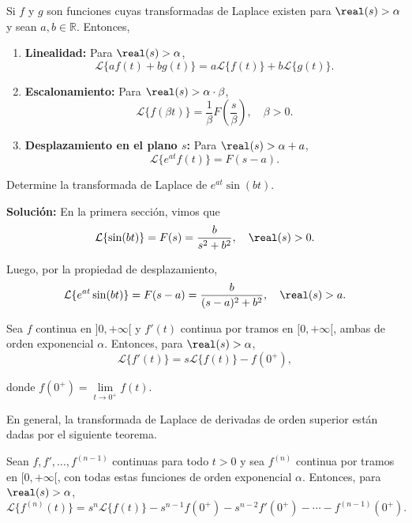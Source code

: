 \begin{teorema}
    Si $f$ y $g$ son funciones cuyas transformadas de Laplace existen para $\real(s) > \alpha$ y sean $a, b \in \mathbb{R}$. Entonces, 
\begin{enumerate}
    \item \textbf{Linealidad:} Para $\real(s) > \alpha$,
    $$\mathcal{L}\{a f(t) + b g(t)\} = a \mathcal{L}\{f(t)\} + b \mathcal{L}\{g(t)\}.$$ 

    \item \textbf{Escalonamiento:} Para $\real(s) > \alpha \cdot \beta$,
    $$\mathcal{L}\{f(\beta t) \} = \frac{1}{\beta} F \left( \frac{s}{\beta}\right), \quad \beta > 0.$$ 
    
    \item \textbf{Desplazamiento en el plano $s$:} Para $\real(s) > \alpha + a$,
    $$\mathcal{L}\{e^{at} f(t)\} = F(s-a).$$
\end{enumerate}
\end{teorema}

\begin{ejemplo}
    Determine la transformada de Laplace de $e^{at} \sin(bt)$.

    \textbf{Solución:} En la primera sección, vimos que
    $$\mathcal{L}\{\sin(bt)\} = F(s) = \frac{b}{s^2+b^2}, \quad \real(s) > 0.$$

    Luego, por la propiedad de desplazamiento,
    $$\mathcal{L}\{e^{at} \sin(bt)\} = F(s-a) = \frac{b}{(s-a)^2+b^2}, \quad \real(s) > a.$$
\end{ejemplo}

\begin{teorema}
    Sea $f$ continua en $]0, + \infty [$ y $f'(t)$ continua por tramos en $[0, + \infty[$, ambas de orden exponencial $\alpha$. Entonces, para $\real(s) > \alpha$,
    $$\mathcal{L}\{f'(t)\} = s \mathcal{L}\{f(t)\} - f(0^+),$$

    donde $f(0^+) = \lim\limits_{t \to 0^+} f(t)$. 
\end{teorema}

En general, la transformada de Laplace de derivadas de orden superior están dadas por el siguiente teorema.

\begin{teorema}
 Sean $f, f', \dots, f^{(n-1)}$ continuas para todo $t>0$ y sea $f^{(n)}$ continua por tramos en $[0,+\infty[$, con todas estas funciones de orden exponencial $\alpha$. Entonces, para $\real(s) > \alpha$,
$$\mathcal{L}\{f^{(n)}(t)\} = s^n \mathcal{L}\{f(t)\} - s^{n-1} f(0^+) - s^{n-2} f'(0^+) - \cdots - f^{(n-1)}(0^+). \label{LaplaceDerivada}$$

\end{teorema}

